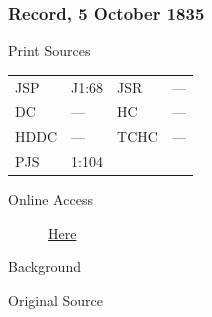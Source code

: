 		\subsubsection{Record, 5 October 1835}
			\label{EMS-1835-JS-5-OCT-1835}
			
			\begin{description}
				\item[Print Sources]
			\end{description}

				\begin{tabular}{p{0.5in}p{1in}p{0.5in}p{1in}}
				JSP	 	& J1:68		& JSR 		& --- \\
				DC	 	& --- 				& HC 		& --- \\
				HDDC 	& ---				& TCHC 		& --- \\
				PJS 	& 1:104			& 	 		&  \\
				\end{tabular}
			
			\begin{description}
				\item[Online Access] \href{https://www.josephsmithpapers.org/paper-summary/journal-1835-1836/5}{Here}
			\end{description}
			
			\begin{description}
				\item[Background]
			\end{description}
			
			
			\begin{description}
				\item[Original Source]
			\end{description}
			
			
